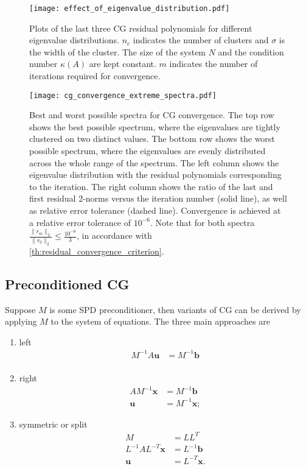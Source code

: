 \begin{figure}[H]
  \centering
  \texttt{[image: effect\_of\_eigenvalue\_distribution.pdf]}
  \caption{Plots of the last three CG residual polynomials for different eigenvalue distributions. $n_c$ indicates the number of clusters and $\sigma$ is the width of the cluster. The size of the system $N$ and the condition number $\kappa(A)$ are kept constant. $m$ indicates the number of iterations required for convergence.}
  \label{fig:cg_effect_of_eigenvalue_distribution}
\end{figure}
\begin{figure}[H]
  \centering
  \texttt{[image: cg\_convergence\_extreme\_spectra.pdf]}
  \caption{Best and worst possible spectra for CG convergence. The top row shows the best possible spectrum, where the eigenvalues are tightly clustered on two distinct values. The bottom row shows the worst possible spectrum, where the eigenvalues are evenly distributed across the whole range of the spectrum. The left column shows the eigenvalue distribution with the residual polynomials corresponding to the iteration. The right column shows the ratio of the last and first residual 2-norms versus the iteration number (solid line), as well as relative error tolerance (dashed line). Convergence is achieved at a relative error tolerance of $10^{-6}$. Note that for both spectra $\frac{\|r_m\|_2}{\|r_0\|_2} \leq \frac{10^{-6}}{3}$, in accordance with \cref{th:residual_convergence_criterion}.}
  \label{fig:cg_best_worst_spectra}
\end{figure}

\subsection{Preconditioned CG} \label{sec:cg_preconditioning}
Suppose $M$ is some SPD preconditioner, then variants of CG can be derived by applying $M$ to the system of equations. The three main approaches are
\begin{enumerate}[label=\textbf{PCG-\arabic*},ref=\textbf{PCG-type \arabic*},leftmargin=1.25cm]
  \item\label{pcg_type:left} left
  \begin{align*}
    M^{-1}A\mathbf{u} & = M^{-1}\mathbf{b} \\
  \end{align*}
  \item\label{pcg_type:right} right
  \begin{align*}
    AM^{-1}\mathbf{x} & = M^{-1}\mathbf{b}  \\
    \mathbf{u}        & = M^{-1}\mathbf{x};
  \end{align*}
  \item\label{pcg_type:symmetric} symmetric or split
  \begin{align*}
    M                       & = LL^T              \\
    L^{-1}AL^{-T}\mathbf{x} & = L^{-1}\mathbf{b}  \\
    \mathbf{u}              & = L^{-T}\mathbf{x}. \\
  \end{align*}
\end{enumerate}


